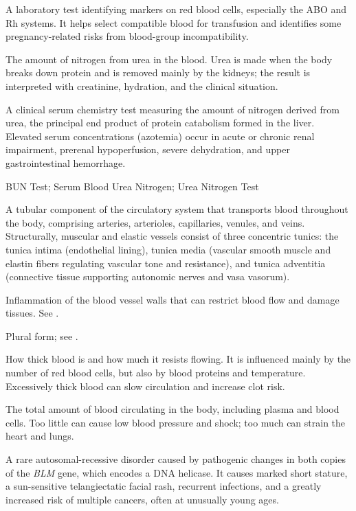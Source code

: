  A laboratory test identifying markers on red blood cells, especially the ABO and Rh systems. It helps select compatible blood for transfusion and identifies some pregnancy-related risks from blood-group incompatibility.

 The amount of nitrogen from urea in the blood. Urea is made when the body breaks down protein and is removed mainly by the kidneys; the result is interpreted with creatinine, hydration, and the clinical situation.

 A clinical serum chemistry test measuring the amount of nitrogen derived from urea, the principal end product of protein catabolism formed in the liver. Elevated serum concentrations (azotemia) occur in acute or chronic renal impairment, prerenal hypoperfusion, severe dehydration, and upper gastrointestinal hemorrhage.

\synonyms
BUN Test; Serum Blood Urea Nitrogen; Urea Nitrogen Test

 A tubular component of the circulatory system that transports blood throughout the body, comprising arteries, arterioles, capillaries, venules, and veins. Structurally, muscular and elastic vessels consist of three concentric tunics: the tunica intima (endothelial lining), tunica media (vascular smooth muscle and elastin fibers regulating vascular tone and resistance), and tunica adventitia (connective tissue supporting autonomic nerves and vasa vasorum).

 Inflammation of the blood vessel walls that can restrict blood flow and damage tissues. See .

 Plural form; see .

 How thick blood is and how much it resists flowing. It is influenced mainly by the number of red blood cells, but also by blood proteins and temperature. Excessively thick blood can slow circulation and increase clot risk.

 The total amount of blood circulating in the body, including plasma and blood cells. Too little can cause low blood pressure and shock; too much can strain the heart and lungs.

 A rare autosomal-recessive disorder caused by pathogenic changes in both copies of the \textit{BLM} gene, which encodes a DNA helicase. It causes marked short stature, a sun-sensitive telangiectatic facial rash, recurrent infections, and a greatly increased risk of multiple cancers, often at unusually young ages.

